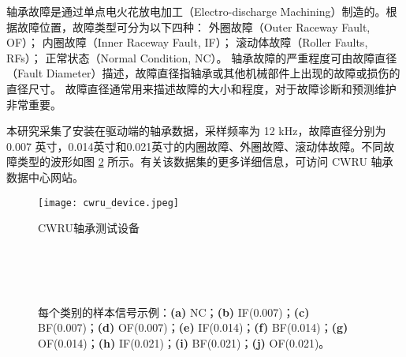 \documentclass[master]{thesis-uestc}
\begin{document}
轴承故障是通过单点电火花放电加工（Electro-discharge Machining）制造的。根据故障位置，故障类型可分为以下四种：  
外圈故障（Outer Raceway Fault, OF）；  
内圈故障（Inner Raceway Fault, IF）；  
滚动体故障（Roller Faults, RFs）；  
正常状态（Normal Condition, NC）。  
轴承故障的严重程度可由故障直径（Fault Diameter）描述，故障直径指轴承或其他机械部件上出现的故障或损伤的直径尺寸。 故障直径通常用来描述故障的大小和程度，对于故障诊断和预测维护非常重要。

本研究采集了安装在驱动端的轴承数据，采样频率为 12 kHz，故障直径分别为 0.007 英寸，0.014英寸和0.021英寸的内圈故障、外圈故障、滚动体故障。不同故障类型的波形如图 \ref{cwru_samples} 所示。有关该数据集的更多详细信息，可访问 CWRU 轴承数据中心网站。  
\begin{figure}[h]
    \centering
    \texttt{[image: cwru\_device.jpeg]}
    \caption{CWRU轴承测试设备}
    \label{cwru_device}
\end{figure}

\begin{figure}
    \centering
    \\ %
    \\ %
    \\ %

    \caption{每个类别的样本信号示例：\textbf{(a)} NC；\textbf{(b)} IF(0.007)；\textbf{(c)} BF(0.007)；\textbf{(d)} OF(0.007)；\textbf{(e)} IF(0.014)；\textbf{(f)} BF(0.014)；\textbf{(g)} OF(0.014)；\textbf{(h)} IF(0.021)；\textbf{(i)} BF(0.021)；\textbf{(j)} OF(0.021)。}
    \label{cwru_samples}
\end{figure}
\end{document}
